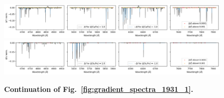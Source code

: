 \documentclass[
  journal=pasa,
  manuscript=research-paper, %
  year=2021,
  volume=37,
]{cup-journal}
\begin{document}
\begin{figure}[hbt!]
 \includegraphics[width=\textwidth]{figures/gradient_spectrum_1931_ca_fe.png}
 \includegraphics[width=\textwidth]{figures/gradient_spectrum_1931_sc_fe.png}
 \caption{\textbf{Continuation of Fig.~\ref{fig:gradient_spectra_1931_1}.}} \label{fig:gradient_spectra_1931_2}
\end{figure}
\end{document}
